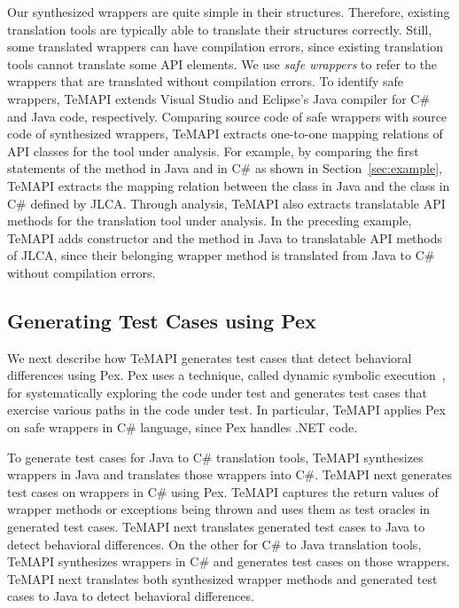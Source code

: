 Our synthesized wrappers are quite simple in their structures. Therefore, existing translation tools are typically able to translate their structures correctly. Still, some translated wrappers can have compilation errors, since existing translation tools cannot translate some API elements. We use \emph{safe wrappers} to refer to the wrappers that are translated without compilation errors. To identify safe wrappers, TeMAPI extends Visual Studio and Eclipse's Java compiler for C\# and Java code, respectively. Comparing source code of safe wrappers with source code of synthesized wrappers, TeMAPI extracts one-to-one mapping relations of API classes for the tool under analysis. For example, by comparing the first statements of the  method in Java and in C\# as shown in Section~\ref{sec:example}, TeMAPI extracts the mapping relation between the  class in Java and the  class in C\# defined by JLCA. Through analysis, TeMAPI also extracts translatable API methods for the translation tool under analysis. In the preceding example, TeMAPI adds  constructor and the  method in Java to translatable API methods of JLCA, since their belonging wrapper method is translated from Java to C\# without compilation errors.

\subsection{Generating Test Cases using Pex}
\label{sec:approach:single}

We next describe how TeMAPI generates test cases that detect behavioral differences using Pex. Pex uses a technique, called dynamic symbolic execution~\cite{koushik:cute, godefroid:dart}, for systematically exploring the code under test and generates test cases that exercise various paths in the code under test. In particular, TeMAPI applies Pex on safe wrappers in C\# language, since Pex handles .NET code. 


To generate test cases for Java to C\# translation tools, TeMAPI synthesizes wrappers in Java and translates those wrappers into C\#. TeMAPI next generates test cases on wrappers in C\# using Pex. TeMAPI captures the return values of wrapper methods or exceptions being thrown and uses them as test oracles in generated test cases. TeMAPI next translates generated test cases to Java to detect behavioral differences. On the other for C\# to Java translation tools, TeMAPI synthesizes wrappers in C\# and generates test cases on those wrappers. TeMAPI next translates both synthesized wrapper methods and generated test cases to Java to detect behavioral differences.

